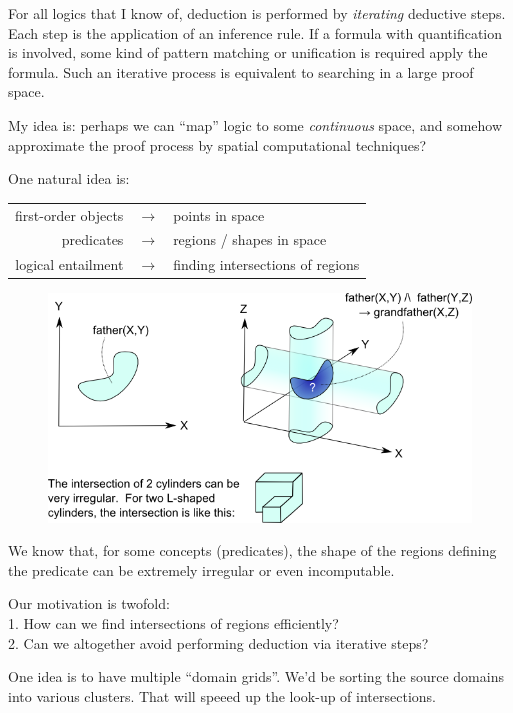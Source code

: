 For all logics that I know of, deduction is performed by \textit{iterating} deductive steps.  Each step is the application of an inference rule.  If a formula with quantification is involved, some kind of pattern matching or unification is required apply the formula.  Such an iterative process is equivalent to searching in a large proof space.

My idea is:  perhaps we can ``map'' logic to some \textit{continuous} space, and somehow approximate the proof process by spatial computational techniques?

One natural idea is:

\tab \begin{tabular}{rll}
first-order objects & $\longrightarrow$ & points in space\\
predicates          & $\longrightarrow$ & regions / shapes in space\\
logical entailment  & $\longrightarrow$ & finding intersections of regions\\
\end{tabular}

\begin{figure}[H]
\centering
\includegraphics[scale=1.0]{cylindrical-logic.png}
\end{figure}

We know that, for some concepts (predicates), the shape of the regions defining the predicate can be extremely irregular or even incomputable.

Our motivation is twofold:\\
1. How can we find intersections of regions efficiently?\\
2. Can we altogether avoid performing deduction via iterative steps?

One idea is to have multiple ``domain grids''.  We'd be sorting the source domains into various clusters.  That will speeed up the look-up of intersections.

